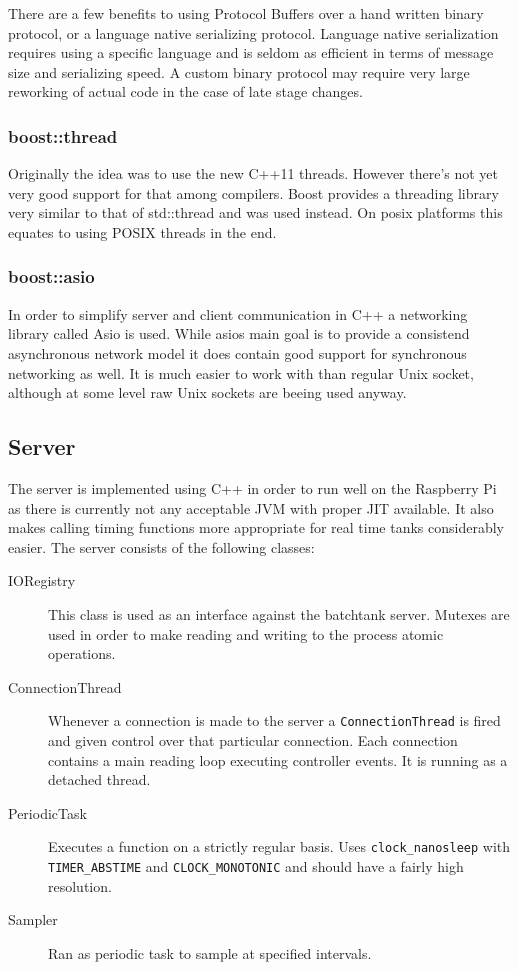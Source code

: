\documentclass{article}
\begin{document}
There are a few benefits to using Protocol Buffers over a hand written
binary protocol, or a language native serializing protocol. Language
native serialization requires using a specific language and is seldom as
efficient in terms of message size and serializing speed. A custom
binary protocol may require very large reworking of actual code in the
case of late stage changes.


\subsubsection{boost::thread~\cite{boost::thread}}
Originally the idea was to use the new C++11 threads. However there's
not yet very good support for that among compilers. Boost provides a
threading library very similar to that of std::thread and was used
instead. On posix platforms this equates to using POSIX threads in the
end.


\subsubsection{boost::asio~\cite{boost::asio}}
In order to simplify server and client communication in C++ a networking
library called Asio is used. While asios main goal is to provide a
consistend asynchronous network model it does contain good support for
synchronous networking as well. It is much easier to work with than
regular Unix socket, although at some level raw Unix sockets are beeing
used anyway.


\subsection{Server}
The server is implemented using C++ in order to run well on the Raspberry Pi as
there is currently not any acceptable JVM with proper JIT available. It
also makes calling timing functions more appropriate for real time tanks
considerably easier. The server consists of the following classes:

\begin{description}
\item[IORegistry]
  This class is used as an interface against the batchtank server.
  Mutexes are used in order to make reading and writing to the process
  atomic operations.

\item[ConnectionThread]
  Whenever a connection is made to the server a \verb+ConnectionThread+
  is fired and given control over that particular connection. Each
  connection contains a main reading loop executing controller events.
  It is running as a detached thread.

\item[PeriodicTask]
  Executes a function on a strictly regular basis. Uses
  \verb+clock_nanosleep+  with \verb+TIMER_ABSTIME+ and
  \verb+CLOCK_MONOTONIC+ and should have a fairly high resolution.

\item[Sampler]
  Ran as periodic task to sample at specified intervals.
\end{description}
\end{document}
